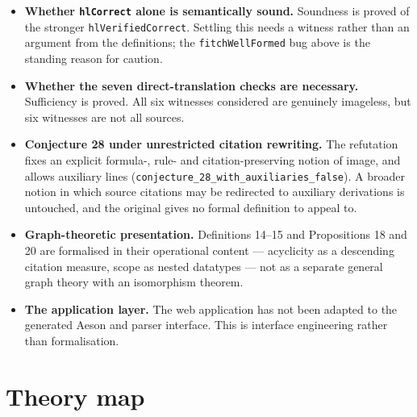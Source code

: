 \documentclass[11pt]{article}
\theoremstyle{plain}
\newcommand{\ubrk}{\_\discretionary{}{}{}}
\newcommand{\isa}[1]{\textup{\texttt{\small #1}}}
\begin{document}
\begin{itemize}
\item \textbf{Whether \isa{hlCorrect} alone is semantically sound.} Soundness is
  proved of the stronger \isa{hlVerifiedCorrect}. Settling this needs a witness
  rather than an argument from the definitions; the \isa{fitchWellFormed} bug
  above is the standing reason for caution.
\item \textbf{Whether the seven direct-translation checks are necessary.}
  Sufficiency is proved. All six witnesses considered are genuinely imageless,
  but six witnesses are not all sources.
\item \textbf{Conjecture 28 under unrestricted citation rewriting.} The
  refutation fixes an explicit formula-, rule- and citation-preserving notion of
  image, and allows auxiliary lines
  (\isa{conjecture\ubrk{}28\ubrk{}with\ubrk{}auxiliaries\ubrk{}false}). A broader notion in which
  source citations may be redirected to auxiliary derivations is untouched, and
  the original gives no formal definition to appeal to.
\item \textbf{Graph-theoretic presentation.} Definitions 14--15 and
  Propositions 18 and 20 are formalised in their operational content ---
  acyclicity as a descending citation measure, scope as nested datatypes --- not
  as a separate general graph theory with an isomorphism theorem.
\item \textbf{The application layer.} The web application has not been adapted
  to the generated Aeson and parser interface. This is interface engineering
  rather than formalisation.
\end{itemize}

\appendix

\section{Theory map}
\end{document}
